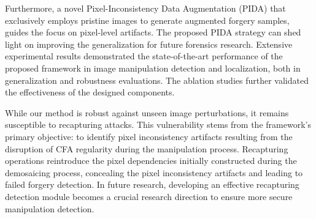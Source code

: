 \documentclass[10pt,journal,compsoc]{IEEEtran}
\begin{document}
Furthermore, a novel Pixel-Inconsistency Data Augmentation (PIDA) that exclusively employs pristine images to generate augmented forgery samples, guides the focus on pixel-level artifacts. The proposed PIDA strategy can shed light on improving the generalization for future forensics research. Extensive experimental results demonstrated the state-of-the-art performance of the proposed framework in image manipulation detection and localization, both in generalization and robustness evaluations. The ablation studies further validated the effectiveness of the designed components. 



While our method is robust against unseen image perturbations, it remains susceptible to recapturing attacks. This vulnerability stems from the framework's primary objective: to identify pixel inconsistency artifacts resulting from the disruption of CFA regularity during the manipulation process. Recapturing operations reintroduce the pixel dependencies initially constructed during the demosaicing process, concealing the pixel inconsistency artifacts and leading to failed forgery detection. In future research, developing an effective recapturing detection module becomes a crucial research direction to ensure more secure manipulation detection.



\end{document}
